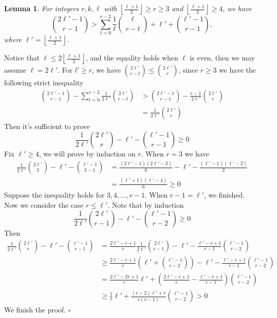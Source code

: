 \documentclass[12pt]{article}%
\newtheorem{lemma}[theorem]{Lemma}
\newenvironment{proof}{{\noindent\it Proof.}}{\hfill $\square$\par}
\newcommand{\lf}{\left\lfloor}
\newcommand{\rf}{\right\rfloor}
\newcommand{\lchuto}{\lf\frac{\ell+1}{2}\rf}
\begin{document}
 \iffalse
  \begin{lemma}\label{lem: the ineuqlaity in sec 3 (1)}
 For integers $r,k,\ell$ with $\lchuto\geq r\geq 3$ and $\lchuto\geq 4$, we have
     $$\binom{2\ell'-1}{r-1}>\sum_{t=0}^{r-2}\frac{1}{\ell}\binom{\ell}{r-t}+\ell'+\binom{\ell'-1}{r-1},$$
     where $\ell'=\lchuto$.
 \end{lemma}
 \begin{proof}
    Notice that $\ell\leq 2\lchuto$, and the equality holds when $\ell$ is even, then we may assume $\ell=2\ell'$.
    For $l'\geq r$, we have $\binom{2\ell'}{r-t}\leq \binom{2\ell'}{r}$, since $r\geq 3$ we have the following strict inequality
     \begin{equation*}
         \begin{aligned}
             \binom{2\ell'-1}{r-1}-\sum_{t=0}^{r-2}\frac{1}{2\ell'}\binom{2\ell'}{r-t}&>\binom{2\ell'-1}{r-1}-\frac{r-1}{2\ell'}\binom{2\ell'}{r}\\
             &=\frac{1}{2\ell'}\binom{2\ell'}{r}
         \end{aligned}
     \end{equation*}
     Then it's sufficient to prove$$\frac{1}{2\ell'}\binom{2\ell'}{r}-\ell'-\binom{\ell'-1}{r-1}\geq 0$$
     Fix $\ell'\geq 4$, we will prove by induction on $r$. When $r=3$ we have
     \begin{equation*}
         \begin{aligned}
             \frac{1}{2\ell'}\binom{2\ell'}{3}-\ell'-\binom{\ell'-1}{3-1}&=\frac{(2\ell'-1)(2\ell'-2)}{6}-\ell'-\frac{(\ell'-1)(\ell'-2)}{2}\\
             &=\frac{(\ell'+1)(\ell'-4)}{6}\geq 0
         \end{aligned}
     \end{equation*}
    Suppose the inequality holds for $3,4,\dots,r-1$. When $r-1=\ell'$, we finished. Now we consider the case $r\leq \ell'$. Note that by induction $$\frac{1}{2\ell'}\binom{2\ell'}{r-1}-\ell'-\binom{\ell'-1}{r-2}\geq 0$$
     Then
     \begin{equation*}
         \begin{aligned}
             \frac{1}{2\ell'}\binom{2\ell'}{r}-\ell'-\binom{\ell'-1}{r-1}&=\frac{2\ell'-r+1}{r}\frac{1}{2\ell'}\binom{2\ell'}{r-1}-\ell'-\frac{\ell'-r+1}{r-1}\binom{\ell'-1}{r-2}\\
             &\geq \frac{2\ell'-r+1}{r}\left(\ell'+\binom{\ell'-1}{r-2}\right)-\ell'-\frac{\ell'-r+1}{r-1}\binom{\ell'-1}{r-2}\\
             &=\frac{2\ell'-2r+1}{r}\ell'+\left(\frac{2\ell'-r+1}{r}-\frac{\ell'-r+1}{r-1}\right)\binom{\ell'-1}{r-2}\\
             &\geq \frac{1}{r}\ell'+\frac{(r-2)\ell'+r}{r(r-1)}\binom{\ell'-1}{r-2}> 0
         \end{aligned}
     \end{equation*}
     We finish the proof.
 \end{proof}
\end{document}
